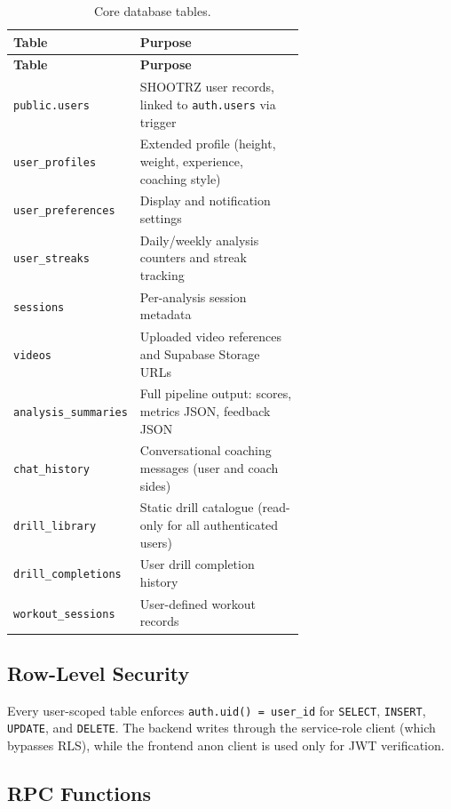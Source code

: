 \begin{longtable}{lp{0.65\linewidth}}
  \caption{Core database tables.}
  \label{tab:db_schema} \\
  \toprule
  \textbf{Table} & \textbf{Purpose} \\
  \midrule
  \endfirsthead
  \toprule
  \textbf{Table} & \textbf{Purpose} \\
  \midrule
  \endhead
  \bottomrule
  \endfoot
  \lstinline|public.users| & SHOOTRZ user records, linked to \lstinline|auth.users| via trigger \\
  \lstinline|user_profiles| & Extended profile (height, weight, experience, coaching style) \\
  \lstinline|user_preferences| & Display and notification settings \\
  \lstinline|user_streaks| & Daily/weekly analysis counters and streak tracking \\
  \lstinline|sessions| & Per-analysis session metadata \\
  \lstinline|videos| & Uploaded video references and Supabase Storage URLs \\
  \lstinline|analysis_summaries| & Full pipeline output: scores, metrics JSON, feedback JSON \\
  \lstinline|chat_history| & Conversational coaching messages (user and coach sides) \\
  \lstinline|drill_library| & Static drill catalogue (read-only for all authenticated users) \\
  \lstinline|drill_completions| & User drill completion history \\
  \lstinline|workout_sessions| & User-defined workout records \\
\end{longtable}

\subsection{Row-Level Security}

Every user-scoped table enforces \lstinline|auth.uid() = user_id| for \lstinline|SELECT|, \lstinline|INSERT|, \lstinline|UPDATE|, and \lstinline|DELETE|. The backend writes through the service-role client (which bypasses RLS), while the frontend anon client is used only for JWT verification.

\subsection{RPC Functions}


